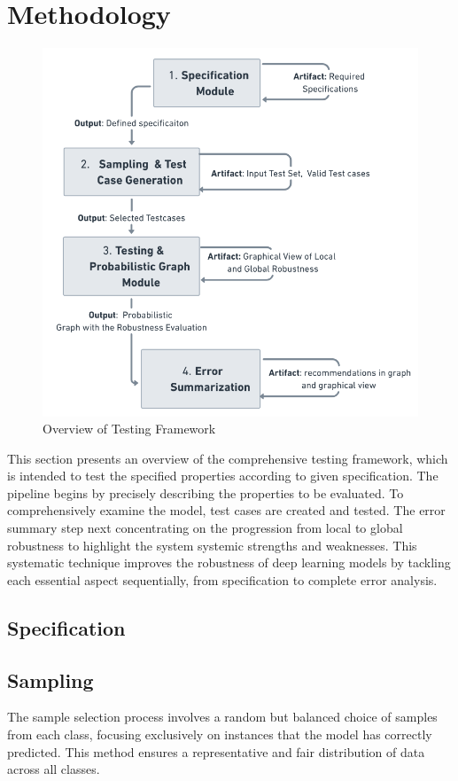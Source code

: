 \documentclass[10pt, conference, a4paper, final]{IEEEtran}
\begin{document}
\section{Methodology}
\begin{figure}{}
    \centering
    \includegraphics[width=\linewidth]{paper_images/framework.png}
    \caption{Overview of Testing Framework}
    \label{fig:graph}
\end{figure}


This section presents an overview of the comprehensive testing framework, which is intended to test the specified properties according to given specification. The pipeline begins by precisely describing the properties to be evaluated. To comprehensively examine the model, test cases are created and tested. The error summary step next concentrating on the progression from local to global robustness to highlight the system systemic strengths and weaknesses. This systematic technique improves the robustness of deep learning models by tackling each essential aspect sequentially, from specification to complete error analysis.
\subsection{Specification}
\subsection{Sampling}
 The sample selection process involves a random but balanced choice of samples from each class, focusing exclusively on instances that the model has correctly predicted. This method ensures a representative and fair distribution of data across all classes.
\end{document}

